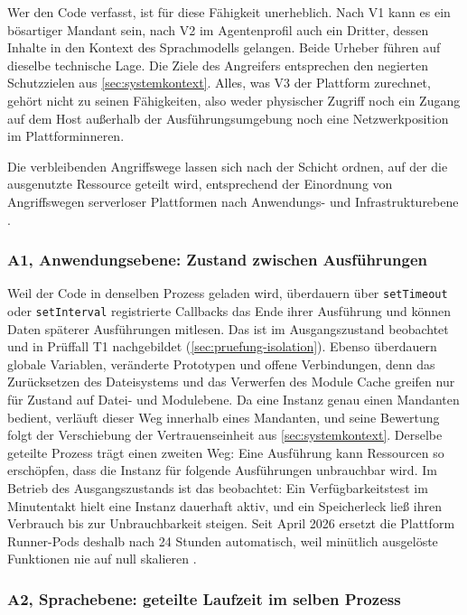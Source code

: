 Wer den Code verfasst, ist für diese Fähigkeit unerheblich. Nach V1 kann es ein bösartiger Mandant
sein, nach V2 im Agentenprofil auch ein Dritter, dessen Inhalte in den Kontext des Sprachmodells
gelangen. Beide Urheber führen auf dieselbe technische Lage. Die Ziele des Angreifers entsprechen
den negierten Schutzzielen aus \autoref{sec:systemkontext}. Alles, was V3 der Plattform zurechnet,
gehört nicht zu seinen Fähigkeiten, also weder physischer Zugriff noch ein Zugang auf dem Host
außerhalb der Ausführungsumgebung noch eine Netzwerkposition im Plattforminneren.

Die verbleibenden Angriffswege lassen sich nach der Schicht ordnen, auf der die ausgenutzte
Ressource geteilt wird, entsprechend der Einordnung von Angriffswegen serverloser Plattformen
nach Anwendungs- und Infrastrukturebene \autocite[S.~8]{marin_serverless_2022}.

\subsubsection{A1, Anwendungsebene: Zustand zwischen Ausführungen}

Weil der Code in denselben Prozess geladen wird, überdauern über \texttt{setTimeout} oder \texttt{setInterval}
registrierte Callbacks das Ende ihrer Ausführung und können Daten späterer Ausführungen mitlesen. Das ist im
Ausgangszustand beobachtet und in Prüffall T1 nachgebildet (\autoref{sec:pruefung-isolation}). Ebenso überdauern globale Variablen, veränderte Prototypen und offene Verbindungen,
denn das Zurücksetzen des Dateisystems und das Verwerfen des Module Cache greifen nur für Zustand auf Datei- und
Modulebene. Da eine Instanz genau einen Mandanten bedient, verläuft dieser Weg innerhalb eines Mandanten, und seine
Bewertung folgt der Verschiebung der Vertrauenseinheit aus \autoref{sec:systemkontext}. Derselbe geteilte Prozess trägt
einen zweiten Weg: Eine Ausführung kann Ressourcen so erschöpfen, dass die Instanz für folgende Ausführungen
unbrauchbar wird. Im Betrieb des Ausgangszustands ist das beobachtet: Ein Verfügbarkeitstest im Minutentakt hielt eine
Instanz dauerhaft aktiv, und ein Speicherleck ließ ihren Verbrauch bis zur Unbrauchbarkeit steigen. Seit April 2026 ersetzt die
Plattform Runner-Pods deshalb nach 24 Stunden automatisch, weil minütlich ausgelöste Funktionen nie auf null skalieren
\autocite{intern_runner_ersatz_2026}.

\subsubsection{A2, Sprachebene: geteilte Laufzeit im selben Prozess}

